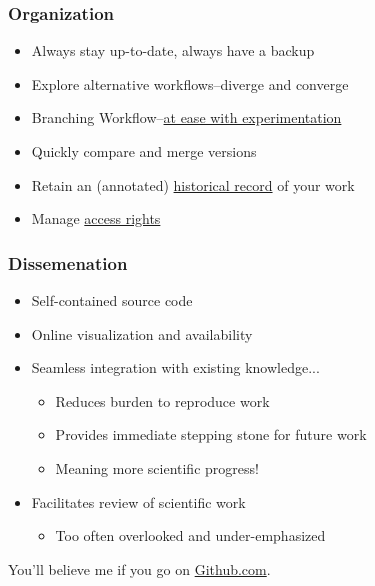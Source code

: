 \begin{frame}\frametitle{Organization}
    \begin{itemize}
        \item Always stay up-to-date, always have a backup
        \item Explore alternative workflows--diverge and converge
        \item Branching Workflow--\href{http://git-scm.com/book/en/Git-Branching}{at ease with experimentation}
        \item Quickly compare and merge versions 
        \item Retain an (annotated) \href{http://git-scm.com/book/en/Git-Basics-Viewing-the-Commit-History}{historical record} of your work
        \item Manage \href{http://git-scm.com/book/en/Git-Internals-Transfer-Protocols}{access rights}
    \end{itemize}
\end{frame}


\begin{frame}
    \frametitle{Dissemenation}
    \begin{itemize}
        \item Self-contained source code
        \item Online visualization and availability
        \item Seamless integration with existing knowledge...
        \begin{itemize}
            \item Reduces burden to reproduce work
            \item Provides immediate stepping stone for future work
            \item Meaning more scientific progress!
        \end{itemize}
        \item Facilitates review of scientific work
        \begin{itemize}
            \item Too often overlooked and under-emphasized
        \end{itemize}
    \end{itemize}
    You'll believe me if you go on \href{https://github.com/}{Github.com}.
\end{frame}


